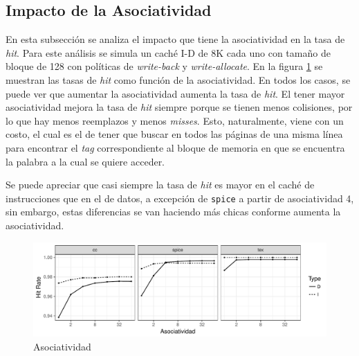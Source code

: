 \documentclass{article}
\begin{document}
\subsection{Impacto de la Asociatividad}



En esta subsección se analiza el impacto que tiene la asociatividad en la tasa de \textit{hit}. Para este análisis se simula un caché I-D de 8K cada uno con tamaño de bloque de 128 con políticas de \textit{write-back} y \textit{write-allocate}. En la figura \ref{fig:3_assoc_size} se muestran las tasas de \textit{hit} como función de la asociatividad. En todos los casos, se puede ver que aumentar la asociatividad aumenta la tasa de \textit{hit}. El tener mayor asociatividad mejora la tasa de \textit{hit} siempre porque se tienen menos colisiones, por lo que hay menos reemplazos y menos \textit{misses}. Esto, naturalmente, viene con un costo, el cual es el de tener que buscar en todos las páginas de una misma línea para encontrar el \textit{tag} correspondiente al bloque de memoria en que se encuentra la palabra a la cual se quiere acceder.

Se puede apreciar que casi siempre la tasa de \textit{hit} es mayor en el caché de instrucciones que en el de datos, a excepción de \texttt{spice} a partir de asociatividad 4, sin embargo, estas diferencias se van haciendo más chicas conforme aumenta la asociatividad. 

\begin{figure}[H]
    \centering
    \includegraphics[width=\textwidth]{3_assoc_size.pdf}
    \caption{Asociatividad}
    \label{fig:3_assoc_size}
\end{figure}
\end{document}
